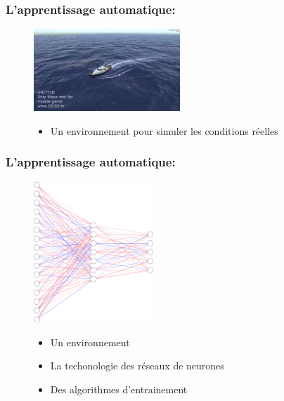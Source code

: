 \documentclass[8pt]{beamer}
\begin{document}
\begin{frame}

  \frametitle{L'apprentissage automatique:}

  \begin{figure}
    \begin{minipage}[c]{.46\linewidth}
      \centering
      \includegraphics[width=55mm]{simulation_boat.jpg}
    \end{minipage}
    \hfill%
    \begin{minipage}[c]{.46\linewidth}
      \centering
      \begin{itemize}
  \item Un environnement pour simuler les conditions réelles \break
    \break \break \break
  \end{itemize}
    \end{minipage}
  \end{figure}

\end{frame}
  
\begin{frame}

  \frametitle{L'apprentissage automatique:}

  \begin{figure}
    \begin{minipage}[c]{.46\linewidth}
      \centering
      \includegraphics[width=45mm]{network_example.png}
    \end{minipage}
    \hfill%
    \begin{minipage}[c]{.46\linewidth}
      \centering
      \begin{itemize}
  \item Un environnement  \break
  \item La techonologie des réseaux de neurones\break
    \pause
  \item Des algorithmes d'entrainement
  \end{itemize}
    \end{minipage}
  \end{figure}

\end{frame}
\end{document}
